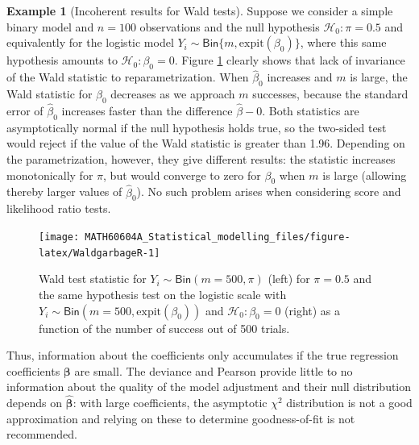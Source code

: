 \documentclass[
  11pt,
  letterpaper,
]{book}
\theoremstyle{definition}
\theoremstyle{definition}
\newtheorem{example}{Example}[chapter]
\theoremstyle{definition}
\theoremstyle{definition}
\theoremstyle{remark}
\begin{document}
\begin{example}[Incoherent results for Wald tests]
\protect\hypertarget{exm:waldgarbage}{}{\label{exm:waldgarbage} {} }Suppose we consider a simple binary model and \(n=100\) observations and the null hypothesis \(\mathscr{H}_0:\pi = 0.5\) and equivalently for the logistic model \(Y_i \sim \mathsf{Bin}\{m, \mathrm{expit}(\beta_0)\}\), where this same hypothesis amounts to \(\mathscr{H}_0:\beta_0=0\). Figure \ref{fig:WaldgarbageR} clearly shows that lack of invariance of the Wald statistic to reparametrization. When \(\widehat{\beta}_0\) increases and \(m\) is large, the Wald statistic for \(\beta_0\) decreases as we approach \(m\) successes, because the standard error of \(\widehat{\beta}_0\) increases faster than the difference \(\widehat{\beta}-0\). Both statistics are asymptotically normal if the null hypothesis holds true, so the two-sided test would reject if the value of the Wald statistic is greater than 1.96. Depending on the parametrization, however, they give different results: the statistic increases monotonically for \(\pi\), but would converge to zero for \(\beta_0\) when \(m\) is large (allowing thereby larger values of \(\widehat{\beta}_0\)). No such problem arises when considering score and likelihood ratio tests.
\end{example}

\begin{figure}

{\centering \texttt{[image: MATH60604A\_Statistical\_modelling\_files/figure-latex/WaldgarbageR-1]} 

}

\caption{Wald test statistic for $Y_i \sim \mathsf{Bin}(m=500, \pi)$ (left)  for $\pi=0.5$ and the same hypothesis test on the logistic scale with $Y_i \sim \mathsf{Bin}(m=500, \mathrm{expit}(\beta_0))$ and $\mathscr{H}_0:\beta_0=0$ (right) as a function of the number of success out of 500 trials.}\label{fig:WaldgarbageR}
\end{figure}

Thus, information about the coefficients only accumulates if the true
regression coefficients \(\boldsymbol{\beta}\) are small. The deviance and
Pearson provide little to no information about the quality of the model
adjustment and their null distribution depends on
\(\widehat{\boldsymbol{\beta}}\): with large coefficients, the asymptotic
\(\chi^2\) distribution is not a good approximation and relying on these
to determine goodness-of-fit is not recommended.
\end{document}
